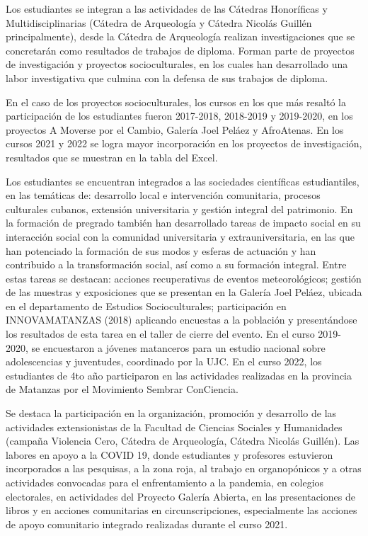 Los estudiantes se integran a las actividades de las Cátedras Honoríficas y Multidisciplinarias (Cátedra de Arqueología y Cátedra Nicolás Guillén principalmente), desde la Cátedra de Arqueología realizan investigaciones que se concretarán como resultados de trabajos de diploma. Forman parte de proyectos de investigación y proyectos socioculturales, en los cuales han desarrollado una labor investigativa que culmina con la defensa de sus trabajos de diploma. 

En el caso de los proyectos socioculturales, los cursos en los que más resaltó la participación de los estudiantes fueron 2017-2018, 2018-2019 y 2019-2020, en los proyectos A Moverse por el Cambio, Galería Joel Peláez y AfroAtenas. En los cursos 2021 y 2022 se logra mayor incorporación en los proyectos de investigación, resultados que se muestran en la tabla del Excel. 

Los estudiantes se encuentran integrados a las sociedades científicas estudiantiles, en las temáticas de: desarrollo local e intervención comunitaria, procesos culturales cubanos, extensión universitaria y gestión integral del patrimonio. 
En la formación de pregrado también han desarrollado tareas de impacto social en su interacción social con la comunidad universitaria y extrauniversitaria, en las que han potenciado la formación de sus modos y esferas de actuación y han contribuido a la transformación social, así como a su formación integral. Entre estas tareas se destacan: acciones recuperativas de eventos meteorológicos; gestión de las muestras y exposiciones que se presentan en la Galería Joel Peláez, ubicada en el departamento de Estudios Socioculturales; participación en INNOVAMATANZAS (2018) aplicando encuestas a la población y presentándose los resultados de esta tarea en el taller de cierre del evento. En el curso 2019-2020, se encuestaron a jóvenes matanceros para un estudio nacional sobre adolescencias y juventudes, coordinado por la UJC. En el curso 2022, los estudiantes de 4to año participaron en las actividades realizadas en la provincia de Matanzas por el Movimiento Sembrar ConCiencia. 

Se destaca la participación en la organización, promoción y desarrollo de las actividades extensionistas de la Facultad de Ciencias Sociales y Humanidades (campaña Violencia Cero, Cátedra de Arqueología, Cátedra Nicolás Guillén). Las labores en apoyo a la COVID 19, donde estudiantes y profesores estuvieron incorporados a las pesquisas, a la zona roja, al trabajo en organopónicos y a otras actividades convocadas para el enfrentamiento a la pandemia, en colegios electorales, en actividades del Proyecto Galería Abierta, en las presentaciones de libros y en acciones comunitarias en circunscripciones, especialmente las acciones de apoyo comunitario integrado realizadas durante el curso 2021.

